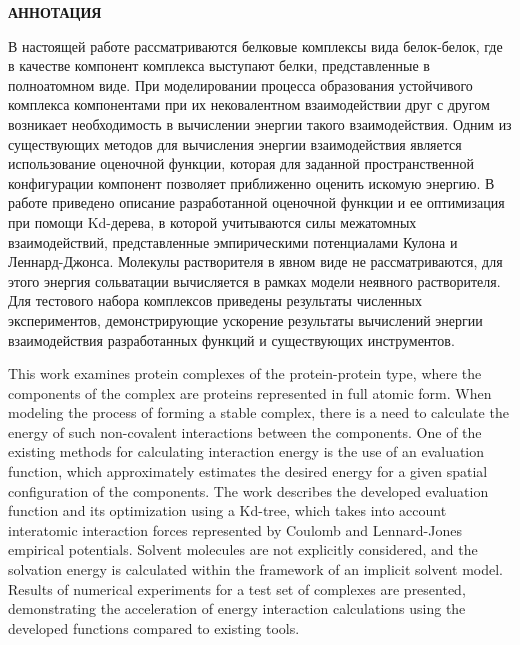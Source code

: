 \newpage
\begin{center}
  \textbf{\large АННОТАЦИЯ}
\end{center}

В настоящей работе рассматриваются белковые комплексы вида белок-белок, где в качестве компонент комплекса выступают белки, представленные в полноатомном виде. При моделировании процесса образования устойчивого комплекса компонентами при их нековалентном взаимодействии друг с другом возникает необходимость в вычислении энергии такого взаимодействия. Одним из существующих методов для вычисления энергии взаимодействия является использование оценочной функции, которая для заданной пространственной конфигурации компонент позволяет приближенно оценить искомую энергию. В работе приведено описание разработанной оценочной функции и ее оптимизация при помощи Kd-дерева, в которой учитываются силы межатомных взаимодействий, представленные эмпирическими потенциалами Кулона и Леннард-Джонса. Молекулы растворителя в явном виде не рассматриваются, для этого энергия сольватации вычисляется в рамках модели неявного растворителя. Для тестового набора комплексов приведены результаты численных экспериментов, демонстрирующие ускорение результаты вычислений энергии взаимодействия разработанных функций и существующих инструментов.

This work examines protein complexes of the protein-protein type, where the components of the complex are proteins represented in full atomic form. When modeling the process of forming a stable complex, there is a need to calculate the energy of such non-covalent interactions between the components. One of the existing methods for calculating interaction energy is the use of an evaluation function, which approximately estimates the desired energy for a given spatial configuration of the components. The work describes the developed evaluation function and its optimization using a Kd-tree, which takes into account interatomic interaction forces represented by Coulomb and Lennard-Jones empirical potentials. Solvent molecules are not explicitly considered, and the solvation energy is calculated within the framework of an implicit solvent model. Results of numerical experiments for a test set of complexes are presented, demonstrating the acceleration of energy interaction calculations using the developed functions compared to existing tools.

\onehalfspacing
\pagestyle{empty} 

\newpage
\renewcommand{\contentsname}{\centerline{\large СОДЕРЖАНИЕ}}
\setcounter{page}{4}
\tableofcontents


